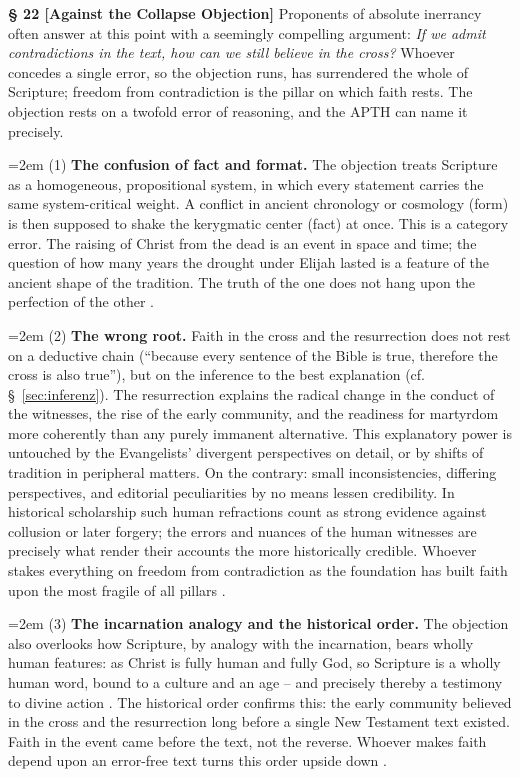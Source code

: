 \documentclass[11pt,a4paper]{article}
\makeatletter
\newcommand{\apth}{{\apthfont APTH}\hspace{0.15em}\xspace}
\newcommand{\subpar}[1]{%
  \begingroup
  \leftskip=2em %
  \noindent#1\par
  \endgroup
}
\newcommand{\apthsec}[3]{%
  \phantomsection%
  \def\@currentlabel{#1}%
  \label{sec:#3}%
  \textbf{§ #1 [#2]}%
}
\makeatother
\begin{document}
\apthsec{22}{Against the Collapse Objection}{kollaps} Proponents of absolute inerrancy often answer at this point with a seemingly compelling argument: \textit{If we admit contradictions in the text, how can we still believe in the cross?} Whoever concedes a single error, so the objection runs, has surrendered the whole of Scripture; freedom from contradiction is the pillar on which faith rests. The objection rests on a twofold error of reasoning, and the \apth can name it precisely.

\subpar{(1) \textbf{The confusion of fact and format.} The objection treats Scripture as a homogeneous, propositional system, in which every statement carries the same system-critical weight. A conflict in ancient chronology or cosmology (form) is then supposed to shake the kerygmatic center (fact) at once. This is a category error. The raising of Christ from the dead is an event in space and time; the question of how many years the drought under Elijah lasted is a feature of the ancient shape of the tradition. The truth of the one does not hang upon the perfection of the other \citep{wright2005}.}

\subpar{(2) \textbf{The wrong root.} Faith in the cross and the resurrection does not rest on a deductive chain (``because every sentence of the Bible is true, therefore the cross is also true''), but on the inference to the best explanation (cf. §~\ref{sec:inferenz}). The resurrection explains the radical change in the conduct of the witnesses, the rise of the early community, and the readiness for martyrdom more coherently than any purely immanent alternative. This explanatory power is untouched by the Evangelists' divergent perspectives on detail, or by shifts of tradition in peripheral matters. On the contrary: small inconsistencies, differing perspectives, and editorial peculiarities by no means lessen credibility. In historical scholarship such human refractions count as strong evidence against collusion or later forgery; the errors and nuances of the human witnesses are precisely what render their accounts the more historically credible. Whoever stakes everything on freedom from contradiction as the foundation has built faith upon the most fragile of all pillars \citep{bauckham2006}.}

\subpar{(3) \textbf{The incarnation analogy and the historical order.} The objection also overlooks how Scripture, by analogy with the incarnation, bears wholly human features: as Christ is fully human and fully God, so Scripture is a wholly human word, bound to a culture and an age -- and precisely thereby a testimony to divine action \citep{enns2005}. The historical order confirms this: the early community believed in the cross and the resurrection long before a single New Testament text existed. Faith in the event came before the text, not the reverse. Whoever makes faith depend upon an error-free text turns this order upside down \citep{sparks2008}.}
\end{document}
